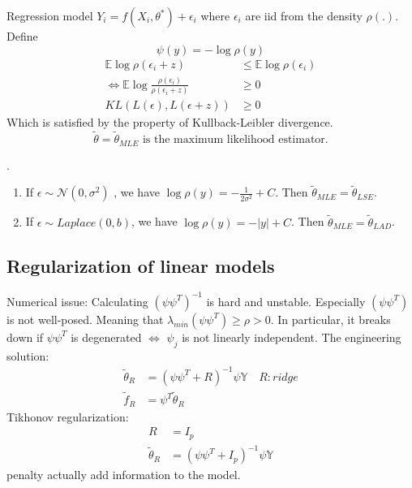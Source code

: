 \begin{example}
	Regression model $Y_i = f(X_i, \theta^*) + \epsilon_i$ where $\epsilon_i$ are iid from the density $\rho(.)$. Define
	\begin{equation*}
		\psi(y)= -\log \rho(y)
	\end{equation*}
	\begin{align*}
		\mathbb{E} \log \rho(\epsilon_i + z) &\leq \mathbb{E} \log \rho(\epsilon_i) \\
		\Leftrightarrow \mathbb{E} \log \frac{\rho(\epsilon_i)}{\rho(\epsilon_i + z)} &\geq 0 \\
		KL( L(\epsilon), L(\epsilon + z)) &\geq 0
	\end{align*}
	Which is satisfied by the property of Kullback-Leibler divergence.
	\begin{equation*}
		\tilde{\theta} = \tilde{\theta}_{MLE} \text{ is the maximum likelihood estimator.}
	\end{equation*}
	 
\end{example}

\begin{remark}.
\begin{enumerate}
	\item If $\epsilon \sim \mathcal{N}(0, \sigma^2)$ , we have $\log \rho(y) = - \frac{1}{2\sigma^2} + C$. Then $\tilde{\theta}_{MLE} = \tilde{\theta}_{LSE}$.
	\item If $\epsilon \sim Laplace(0, b)$, we have $\log \rho(y) = -|y| + C$. Then $\tilde{\theta}_{MLE} = \tilde{\theta}_{LAD}$.
\end{enumerate}
\end{remark}
 



\subsection{Regularization of linear models}
Numerical issue: Calculating $(\psi \psi^T)^{-1}$ is hard and unstable. Especially $(\psi \psi^T)$ is not well-posed. Meaning that $\lambda_{min} (\psi \psi^T) \geq \rho > 0$. In particular, it breaks down if $\psi \psi^T$ is degenerated $\Leftrightarrow$ $\psi_j$ is not linearly independent. The engineering solution:
\begin{align*}
	\tilde{\theta}_R &= (\psi \psi^T + R)^{-1} \psi \mathbb{Y} \quad R: ridge\\
	\tilde{f}_R &= \psi^T \tilde{\theta}_R 
\end{align*}
Tikhonov regularization:
\begin{align*}
	R &= I_p\\
	\tilde{\theta}_R &= (\psi \psi^T + I_p)^{-1} \psi \mathbb{Y}
\end{align*}
penalty actually add information to the model.


